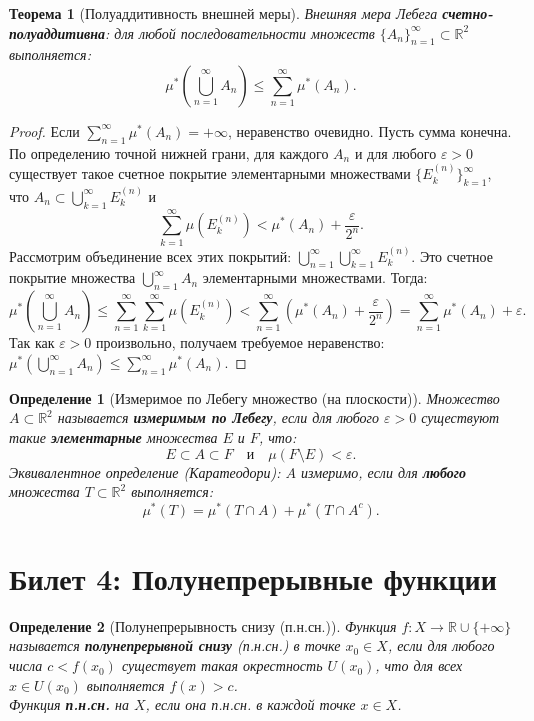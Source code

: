 \documentclass[a4paper, 12pt]{article}
\newtheorem{definition}{Определение}
\newtheorem{theorem}{Теорема}
\newcommand{\R}{\mathbb{R}}
\newcommand{\1}{\mathbf{1}}
\begin{document}
\begin{theorem}[Полуаддитивность внешней меры]
    Внешняя мера Лебега \textbf{счетно-полуаддитивна}: для любой последовательности множеств $\{A_n\}_{n=1}^{\infty} \subset \R^2$ выполняется:
    \[
    \mu^*\left( \bigcup_{n=1}^{\infty} A_n \right) \leq \sum_{n=1}^{\infty} \mu^*(A_n).
    \]
\end{theorem}

\begin{proof}
    Если $\sum_{n=1}^{\infty} \mu^*(A_n) = +\infty$, неравенство очевидно. Пусть сумма конечна. По определению точной нижней грани, для каждого $A_n$ и для любого $\varepsilon > 0$ существует такое счетное покрытие элементарными множествами $\{E_k^{(n)}\}_{k=1}^{\infty}$, что $A_n \subset \bigcup_{k=1}^{\infty} E_k^{(n)}$ и
    \[
    \sum_{k=1}^{\infty} \mu(E_k^{(n)}) < \mu^*(A_n) + \frac{\varepsilon}{2^n}.
    \]
    Рассмотрим объединение всех этих покрытий: $\bigcup_{n=1}^{\infty} \bigcup_{k=1}^{\infty} E_k^{(n)}$. Это счетное покрытие множества $\bigcup_{n=1}^{\infty} A_n$ элементарными множествами. Тогда:
    \[
    \mu^*\left( \bigcup_{n=1}^{\infty} A_n \right) \leq \sum_{n=1}^{\infty} \sum_{k=1}^{\infty} \mu(E_k^{(n)}) < \sum_{n=1}^{\infty} \left( \mu^*(A_n) + \frac{\varepsilon}{2^n} \right) = \sum_{n=1}^{\infty} \mu^*(A_n) + \varepsilon.
    \]
    Так как $\varepsilon > 0$ произвольно, получаем требуемое неравенство: $\mu^*\left( \bigcup_{n=1}^{\infty} A_n \right) \leq \sum_{n=1}^{\infty} \mu^*(A_n)$.
\end{proof}

\begin{definition}[Измеримое по Лебегу множество (на плоскости)]
    Множество $A \subset \R^2$ называется \textbf{измеримым по Лебегу}, если для любого $\varepsilon > 0$ существуют такие \textbf{элементарные} множества $E$ и $F$, что:
    \[
    E \subset A \subset F \quad \text{и} \quad \mu(F \setminus E) < \varepsilon.
    \]
    \textit{Эквивалентное определение (Каратеодори):} $A$ измеримо, если для \textbf{любого} множества $T \subset \R^2$ выполняется:
    \[
    \mu^*(T) = \mu^*(T \cap A) + \mu^*(T \cap A^c).
    \]
\end{definition}

\section*{Билет 4: Полунепрерывные функции}
\begin{definition}[Полунепрерывность снизу (п.н.сн.)]
    Функция $f: X \to \R \cup \{+\infty\}$ называется \textbf{полунепрерывной снизу} (п.н.сн.) в точке $x_0 \in X$, если для любого числа $c < f(x_0)$ существует такая окрестность $U(x_0)$, что для всех $x \in U(x_0)$ выполняется $f(x) > c$. \\
    Функция \textbf{п.н.сн.} на $X$, если она п.н.сн. в каждой точке $x \in X$.
\end{definition}
\end{document}
